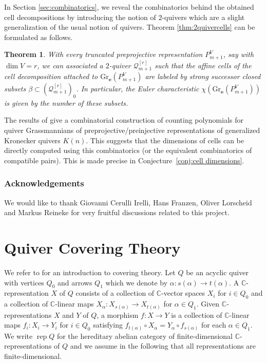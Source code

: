 \documentclass[smallextended,envcountsect,envcountsame]{svjour3}
\newtheorem{thm}{Theorem}
\numberwithin{equation}{section}
\newcommand{\C}{\mathbb{C}}
\newcommand{\CC}{\mathbb{C}}
\newcommand{\bfe}{\mathbf{e}}
\newcommand{\Gr}{\mathrm{Gr}}
\newcommand{\rep}{\operatorname{rep}}
\begin{document}
In Section \ref{sec:combinatorics}, we reveal the combinatorics behind the obtained cell decompositions by introducing the notion of $2$-quivers which are a slight generalization of the usual notion of quivers.
Theorem \ref{thm:2quivercells} can be formulated as follows.
\begin{thm}
  With every truncated preprojective representation $P_{m+1}^V$, say with $\dim V=r$, we can associated a $2$-quiver $\mathcal Q_{m+1}^{[r]}$ such that the affine cells of the cell decomposition attached to $\Gr_\bfe(P_{m+1}^V)$ are labeled by strong successor closed subsets $\beta\subset (\mathcal Q_{m+1}^{[r]})_0$.
  In particular, the Euler characteristic $\chi(\Gr_\bfe(P_{m+1}^V))$ is given by the number of these subsets.
\end{thm}

The results of \cite{rupel} give a combinatorial construction of counting polynomials for quiver Grassmannians of preprojective/preinjective representations of generalized Kronecker quivers $K(n)$.
This suggests that the dimensions of cells can be directly computed using this combinatorics (or the equivalent combinatorics of compatible pairs).
This is made precise in Conjecture~\ref{conj:cell dimensions}.

\subsubsection*{Acknowledgements}
We would like to thank Giovanni Cerulli Irelli, Hans Franzen, Oliver Lorscheid and Markus Reineke for very fruitful discussions related to this project.


\section{Quiver Covering Theory}
\label{sec:covering}
\noindent
We refer to \cite{gab} for an introduction to covering theory.
Let $Q$ be an acyclic quiver with vertices $Q_0$ and arrows $Q_1$ which we denote by $\alpha:s(\alpha)\to t(\alpha)$.
A $\CC$-representation $X$ of $Q$ consists of a collection of $\CC$-vector spaces $X_i$ for $i\in Q_0$ and a collection of $\CC$-linear maps $X_\alpha:X_{s(\alpha)}\to X_{t(\alpha)}$ for $\alpha\in Q_1$.
Given $\CC$-representations $X$ and $Y$ of $Q$, a morphism $f:X\to Y$ is a collection of $\CC$-linear maps $f_i:X_i\to Y_i$ for $i\in Q_0$ satisfying $f_{t(\alpha)}\circ X_\alpha=Y_\alpha\circ f_{s(\alpha)}$ for each $\alpha\in Q_1$.
We write $\rep Q$ for the hereditary abelian category of finite-dimensional $\C$-representations of $Q$ and we assume in the following that all representations are finite-dimensional.
\end{document}
